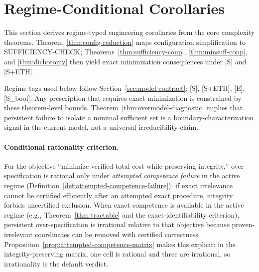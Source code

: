\section{Regime-Conditional Corollaries}\label{sec:engineering-justification}

This section derives regime-typed engineering corollaries from the core complexity theorems. Theorem~\ref{thm:config-reduction} maps configuration simplification to SUFFICIENCY-CHECK; Theorems~\ref{thm:sufficiency-conp}, \ref{thm:minsuff-conp}, and \ref{thm:dichotomy} then yield exact minimization consequences under [S] and [S+ETH].

Regime tags used below follow Section~\ref{sec:model-contract}: [S], [S+ETH], [E], [S\_bool].
Any prescription that requires exact minimization is constrained by these theorem-level bounds.
Theorem~\ref{thm:overmodel-diagnostic} implies that persistent failure to isolate a minimal sufficient set is a boundary-characterization signal in the current model, not a universal irreducibility claim.

\paragraph{Conditional rationality criterion.}
For the objective ``minimize verified total cost while preserving integrity,'' over-specification is rational only under \emph{attempted competence failure} in the active regime (Definition~\ref{def:attempted-competence-failure}): if exact irrelevance cannot be certified efficiently after an attempted exact procedure, integrity forbids uncertified exclusion.
When exact competence is available in the active regime (e.g., Theorem~\ref{thm:tractable} and the exact-identifiability criterion), persistent over-specification is irrational relative to that objective because proven-irrelevant coordinates can be removed with certified correctness.
Proposition~\ref{prop:attempted-competence-matrix} makes this explicit: in the integrity-preserving matrix, one cell is rational and three are irrational, so irrationality is the default verdict.

